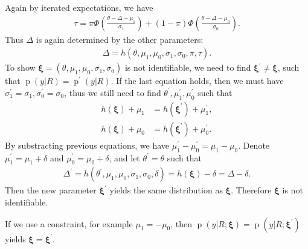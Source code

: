 \documentclass[12pt]{article}
\DeclareMathOperator{\pr}{p}
\begin{document}
Again by iterated expectations, we have
\begin{align*}
  \tau = \pi \Phi \left( \frac{\theta - \Delta - \mu_1}{\sigma_1}
  \right) + (1 - \pi) \Phi \left( \frac{\theta - \Delta -
      \mu_0}{\sigma_0} \right).
\end{align*}
Thus $\Delta$ is again determined by the other parameters:
\begin{align*}
  \Delta = h(\theta, \mu_1, \mu_0, \sigma_1, \sigma_0 , \pi, \tau).
\end{align*}
To show $\bm \xi = (\theta, \mu_1, \mu_0, \sigma_1, \sigma_0)$ is not
identifiable, we need to find $\bm \xi^{'} \neq \bm \xi$, such that
$\pr(y|R) = \pr^{'}(y|R)$. If the last equation holds, then we must
have $\sigma_1^{'} = \sigma_1, \sigma_0^{'} = \sigma_0$, thus we still
need to find $\theta^{'} , \mu_1^{'}, \mu_0^{'}$ such that
\begin{align*}
  h(\bm \xi) + \mu_1 & = h(\bm \xi^{'}) + \mu_1^{'} ,\\
  h(\bm \xi) + \mu_0 & = h(\bm \xi^{'}) + \mu_0^{'}.
\end{align*}
By substracting previous equations, we have $\mu_1^{'}- \mu_0^{'} =
\mu_1- \mu_0$. Denote $\mu_1^{'} = \mu_1 + \delta$ and $\mu_0^{'} =
\mu_0 + \delta$, and let $\theta^{'} = \theta$ such that
\begin{align*}
  \Delta^{'} = h(\theta^{'}, \mu_1, \mu_0, \sigma_1, \sigma_0, \delta)
  = h(\bm \xi) - \delta = \Delta - \delta.
\end{align*}
Then the new parameter $\bm \xi^{'}$ yields the same distribution as
$\bm \xi$. Therefore $\bm \xi$ is not identifiable.

If we use a constraint, for example $\mu_1 = -\mu_0$, then
$\pr(y|R;\bm \xi) = \pr(y|R; \bm \xi^{'})$ yields $\bm \xi = \bm
\xi^{'}$.
\end{document}
